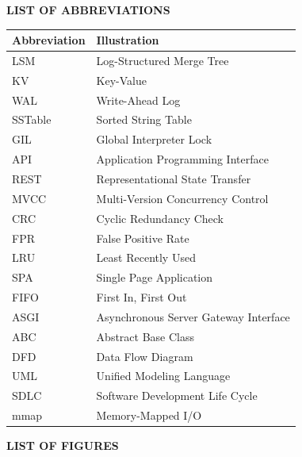 \documentclass[oneside,a4paper,12pt]{book}
\begin{document}
\newpage
\begin{center}
{\bfseries \fontsize{14}{17}\selectfont LIST OF ABBREVIATIONS}
\end{center}
\vspace*{2\baselineskip}

\renewcommand{\arraystretch}{1.3}
\noindent
\begin{tabularx}{\textwidth}{|p{4cm}|X|}
\hline
\textbf{Abbreviation} & \textbf{Illustration} \\
\hline
LSM & Log-Structured Merge Tree \\
\hline
KV & Key-Value \\
\hline
WAL & Write-Ahead Log \\
\hline
SSTable & Sorted String Table \\
\hline
GIL & Global Interpreter Lock \\
\hline
API & Application Programming Interface \\
\hline
REST & Representational State Transfer \\
\hline
MVCC & Multi-Version Concurrency Control \\
\hline
CRC & Cyclic Redundancy Check \\
\hline
FPR & False Positive Rate \\
\hline
LRU & Least Recently Used \\
\hline
SPA & Single Page Application \\
\hline
FIFO & First In, First Out \\
\hline
ASGI & Asynchronous Server Gateway Interface \\
\hline
ABC & Abstract Base Class \\
\hline
DFD & Data Flow Diagram \\
\hline
UML & Unified Modeling Language \\
\hline
SDLC & Software Development Life Cycle \\
\hline
mmap & Memory-Mapped I/O \\
\hline
\end{tabularx}

\newpage
\begin{center}
{\bfseries \fontsize{14}{17}\selectfont LIST OF FIGURES}
\end{center}
\vspace*{2\baselineskip}
\end{document}
